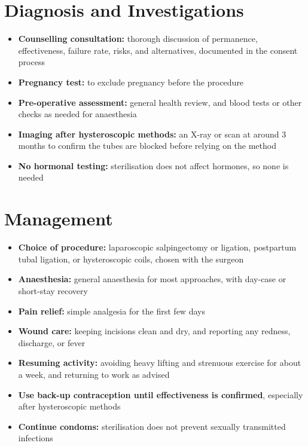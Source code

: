 \section*{Diagnosis and Investigations}
\begin{itemize}
    \item \textbf{Counselling consultation:} thorough discussion of permanence, effectiveness, failure rate, risks, and alternatives, documented in the consent process
    \item \textbf{Pregnancy test:} to exclude pregnancy before the procedure
    \item \textbf{Pre-operative assessment:} general health review, and blood tests or other checks as needed for anaesthesia
    \item \textbf{Imaging after hysteroscopic methods:} an X-ray or scan at around 3 months to confirm the tubes are blocked before relying on the method
    \item \textbf{No hormonal testing:} sterilisation does not affect hormones, so none is needed
\end{itemize}

\section*{Management}
\begin{itemize}
    \item \textbf{Choice of procedure:} laparoscopic salpingectomy or ligation, postpartum tubal ligation, or hysteroscopic coils, chosen with the surgeon
    \item \textbf{Anaesthesia:} general anaesthesia for most approaches, with day-case or short-stay recovery
    \item \textbf{Pain relief:} simple analgesia for the first few days
    \item \textbf{Wound care:} keeping incisions clean and dry, and reporting any redness, discharge, or fever
    \item \textbf{Resuming activity:} avoiding heavy lifting and strenuous exercise for about a week, and returning to work as advised
    \item \textbf{Use back-up contraception until effectiveness is confirmed}, especially after hysteroscopic methods
    \item \textbf{Continue condoms:} sterilisation does not prevent sexually transmitted infections
\end{itemize}

